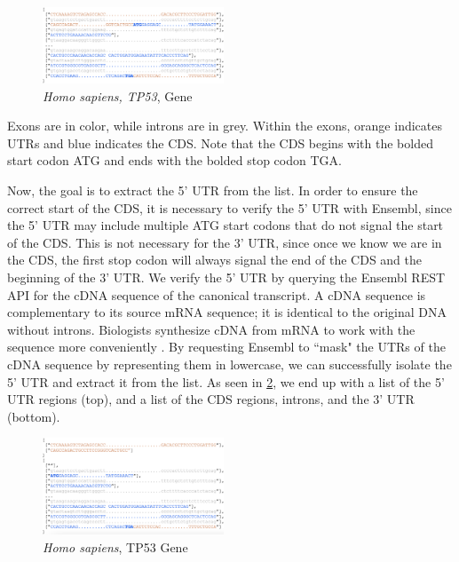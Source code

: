 \documentclass[letterpaper]{article}
\begin{document}
\begin{figure}[h!]
\centering
\vspace{-3mm}
\includegraphics[width=0.48\textwidth]{images/pre_processed_seq_homo_sapiens_tp53_ABBREV}
  \caption{\textit{Homo sapiens, TP53}, Gene}\label{fig:pre_processed_seq_homo_sapiens_tp53}
  \vspace{-6mm}
\end{figure}

Exons are in color, while introns are in grey. Within the exons, orange indicates UTRs and blue indicates the CDS. Note that the CDS begins with the bolded start codon ATG and ends with the bolded stop codon TGA.

Now, the goal is to extract the 5’ UTR from the list. In order to ensure the correct start of the CDS, it is necessary to verify the 5’ UTR with Ensembl, since the 5' UTR may include multiple ATG start codons that do not signal the start of the CDS. This is not necessary for the 3’ UTR, since once we know we are in the CDS, the first stop codon will always signal the end of the CDS and the beginning of the 3’ UTR. We verify the 5’ UTR by querying the Ensembl REST API for the cDNA sequence of the canonical transcript. A cDNA sequence is complementary to its source mRNA sequence; it is identical to the original DNA without introns. Biologists synthesize cDNA from mRNA to work with the sequence more conveniently \cite{ensembl_glossary}. By requesting Ensembl to ``mask" the UTRs of the cDNA sequence by representing them in lowercase, we can successfully isolate the 5’ UTR and extract it from the list. As seen in \ref{fig:post_processed_seq_homo_sapiens_tp53}, we end up with a list of the 5’ UTR regions (top), and a list of the CDS regions, introns, and the 3’ UTR (bottom).

\begin{figure}[h!]
\centering
\vspace{-3mm}
\includegraphics[width=0.48\textwidth]{images/post_processed_seq_homo_sapiens_tp53_ABBREV}
  \caption{\textit{Homo sapiens}, TP53 Gene}\label{fig:post_processed_seq_homo_sapiens_tp53}
  \vspace{-3mm}
\end{figure}
\end{document}

